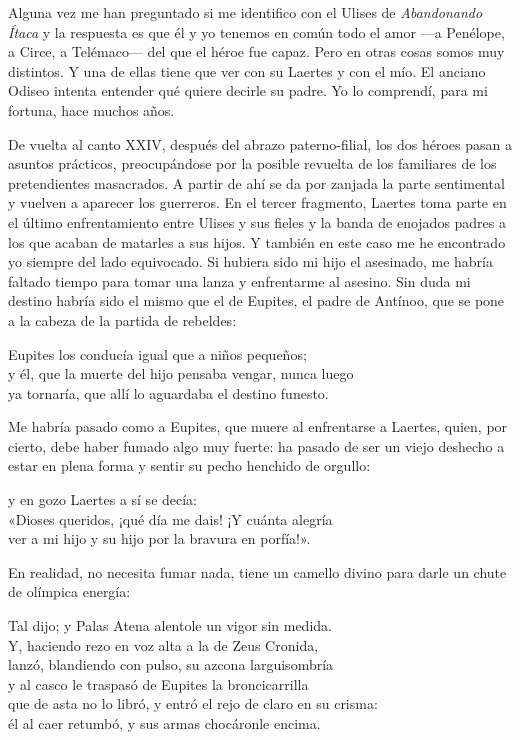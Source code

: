 Alguna vez me han preguntado si me identifico con el Ulises de \emph{Abandonando Ítaca} y la respuesta es que él y yo tenemos en común todo el amor ---a Penélope, a Circe, a Telémaco--- del que el héroe fue capaz. Pero en otras cosas somos muy distintos. Y una de ellas tiene que ver con su Laertes y con el mío. El anciano Odiseo intenta entender qué quiere decirle su padre. Yo lo comprendí, para mi fortuna, hace muchos años.

De vuelta al canto XXIV, después del abrazo paterno-filial, los dos héroes pasan a asuntos prácticos, preocupándose por la posible revuelta de los familiares de los pretendientes masacrados. A partir de ahí se da por zanjada la parte sentimental y vuelven a aparecer los guerreros. En el tercer fragmento, Laertes toma parte en el último enfrentamiento entre Ulises y sus fieles y la banda de enojados padres a los que acaban de matarles a sus hijos. Y también en este caso me he encontrado yo siempre del lado equivocado. Si hubiera sido mi hijo el asesinado, me habría faltado tiempo para tomar una lanza y enfrentarme al asesino. Sin duda mi destino habría sido el mismo que el de Eupites, el padre de Antínoo, que se pone a la cabeza de la partida de rebeldes:

\begin{versocita}
Eupites los conducía igual que a niños pequeños;\\
y él, que la muerte del hijo pensaba vengar, nunca luego\\
ya tornaría, que allí lo aguardaba el destino funesto.
\end{versocita}

Me habría pasado como a Eupites, que muere al enfrentarse a Laertes, quien, por cierto, debe haber fumado algo muy fuerte: ha pasado de ser un viejo deshecho a estar en plena forma y sentir su pecho henchido de orgullo:

\begin{versocita}
[...] y en gozo Laertes a sí se decía:\\
«Dioses queridos, ¡qué día me dais! ¡Y cuánta alegría\\
ver a mi hijo y su hijo por la bravura en porfía!».
\end{versocita}

En realidad, no necesita fumar nada, tiene un camello divino para darle un chute de olímpica energía:

\begin{versocita}
Tal dijo; y Palas Atena alentole un vigor sin medida.\\
Y, haciendo rezo en voz alta a la de Zeus Cronida,\\
lanzó, blandiendo con pulso, su azcona larguisombría\\
y al casco le traspasó de Eupites la broncicarrilla\\
que de asta no lo libró, y entró el rejo de claro en su crisma:\\
él al caer retumbó, y sus armas chocáronle encima.
\end{versocita}

